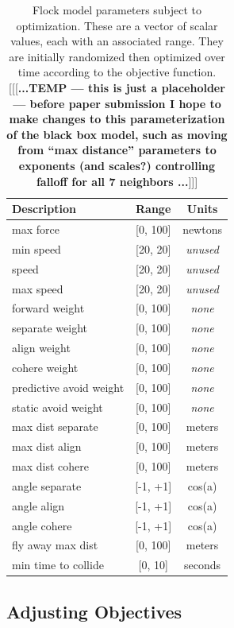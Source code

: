 \documentclass[letterpaper]{article}
\begin{document}
\begin{table}[b]
\centering
\begin{tabular}{ | l | c | c | }
    \hline
    \textbf{Description} & \textbf{Range} & \textbf{Units} \\
    \hline
    max force & [0, 100] & newtons \\
    min speed & [20, 20] & \textit{unused} \\
    speed & [20, 20] & \textit{unused} \\
    max speed & [20, 20] & \textit{unused} \\
    forward weight & [0, 100] & \textit{none} \\
    separate weight & [0, 100] & \textit{none} \\
    align weight & [0, 100] & \textit{none} \\
    cohere weight & [0, 100] & \textit{none} \\
    predictive avoid weight & [0, 100] & \textit{none} \\
    static avoid weight & [0, 100] & \textit{none} \\
    max dist separate & [0, 100] & meters \\
    max dist align & [0, 100] & meters \\
    max dist cohere & [0, 100] & meters \\
    angle separate & [-1, +1] & cos(a) \\
    angle align & [-1, +1] & cos(a) \\
    angle cohere & [-1, +1] & cos(a) \\
    fly away max dist & [0, 100] & meters \\
    min time to collide & [0, 10] & seconds \\
    \hline
\end{tabular}
\caption{Flock model parameters subject to optimization. These are a vector of scalar values, each with an associated range. They are initially randomized then optimized over time according to the objective function. [[[\textbf{...TEMP --- this is just a placeholder --- before paper submission I hope to make changes to this parameterization of the black box model, such as moving from ``max distance'' parameters to exponents (and scales?) controlling falloff for all 7 neighbors ...}]]] }
\label{table:flock-parameters}
\end{table}


\subsection{Adjusting Objectives}
\label{subsec:adjust_objective}
\end{document}
